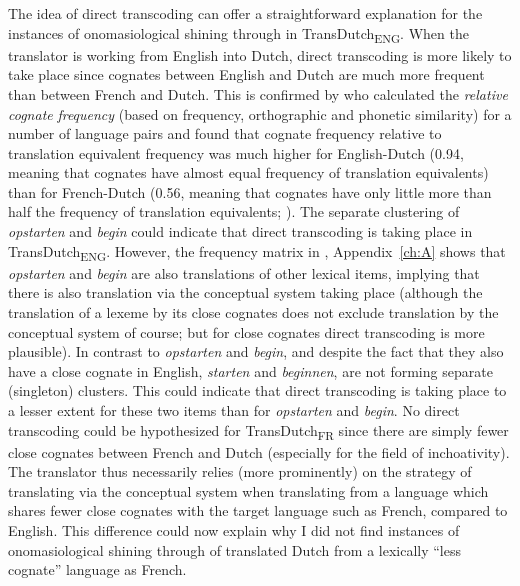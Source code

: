 The idea of direct transcoding can offer a straightforward explanation for the instances of onomasiological shining through in TransDutch\textsubscript{ENG}. When the translator is working from English into Dutch, direct transcoding is more likely to take place since cognates between English and Dutch are much more frequent than between French and Dutch. This is confirmed by \citet{schepens_cross-language_2013} who calculated the \textit{relative} \textit{cognate} \textit{frequency} (based on frequency, orthographic and phonetic similarity) for a number of language pairs and found that cognate frequency relative to translation equivalent frequency was much higher for English-Dutch (0.94, meaning that cognates have almost equal frequency of translation equivalents) than for French-Dutch (0.56, meaning that cognates have only little more than half the frequency of translation equivalents; \citealt[4]{schepens_cross-language_2013}). The separate clustering of \textit{opstarten} and \textit{begin} could indicate that direct transcoding is taking place in TransDutch\textsubscript{ENG}. However, the frequency matrix in , Appendix~\ref{ch:A} shows that \textit{opstarten} and \textit{begin} are also translations of other lexical items, implying that there is also translation via the conceptual system taking place (although the translation of a lexeme by its close cognates does not exclude translation by the conceptual system of course; but for close cognates direct transcoding is more plausible). In contrast to \textit{opstarten} and \textit{begin}, and despite the fact that they also have a close cognate in English, \textit{starten} and \textit{beginnen}, are not forming separate (singleton) clusters. This could indicate that direct transcoding is taking place to a lesser extent for these two items than for \textit{opstarten} and \textit{begin}. No direct transcoding could be hypothesized for TransDutch\textsubscript{FR} since there are simply fewer close cognates between French and Dutch (especially for the field of inchoativity). The translator thus necessarily relies (more prominently) on the strategy of translating via the conceptual system when translating from a language which shares fewer close cognates with the target language such as French, compared to English. This difference could now explain why I did not find instances of onomasiological shining through of translated Dutch from a lexically ``less cognate'' language as French.

